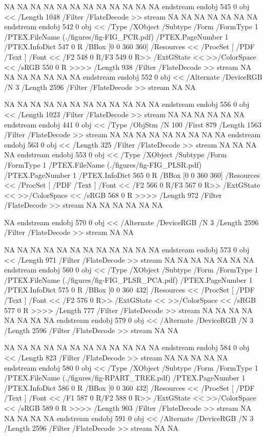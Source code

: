 {NA
NA
NA
NA
NA
NA
NA
NA
NA
NA
NA
NA
endstream
endobj
545 0 obj <<
/Length 1048      
/Filter /FlateDecode
>>
stream
NA
NA
NA
NA
NA
NA
NA
endstream
endobj
542 0 obj <<
/Type /XObject
/Subtype /Form
/FormType 1
/PTEX.FileName (./figures/fig-FIG_PCR.pdf)
/PTEX.PageNumber 1
/PTEX.InfoDict 547 0 R
/BBox [0 0 360 360]
/Resources <<
/ProcSet [ /PDF /Text ]
/Font << /F2 548 0 R/F3 549 0 R>>
/ExtGState <<
>>/ColorSpace <<
/sRGB 550 0 R
>>>>
/Length 938
/Filter /FlateDecode
>>
stream
NA
NA
NA
NA
NA
NA
NA
endstream
endobj
552 0 obj
<<
/Alternate /DeviceRGB
/N 3
/Length 2596
/Filter /FlateDecode
>>
stream
NA
NA

NA
NA
NA
NA
NA
NA
NA
NA
NA
NA
NA
NA
endstream
endobj
556 0 obj <<
/Length 1023      
/Filter /FlateDecode
>>
stream
NA
NA
NA
NA
NA
NA
endstream
endobj
441 0 obj <<
/Type /ObjStm
/N 100
/First 879
/Length 1563      
/Filter /FlateDecode
>>
stream
NA
NA
NA
NA
NA
NA
NA
NA
NA
endstream
endobj
563 0 obj <<
/Length 325       
/Filter /FlateDecode
>>
stream
NA
NA
NA
NA
endstream
endobj
553 0 obj <<
/Type /XObject
/Subtype /Form
/FormType 1
/PTEX.FileName (./figures/fig-FIG_PLSR.pdf)
/PTEX.PageNumber 1
/PTEX.InfoDict 565 0 R
/BBox [0 0 360 360]
/Resources <<
/ProcSet [ /PDF /Text ]
/Font << /F2 566 0 R/F3 567 0 R>>
/ExtGState <<
>>/ColorSpace <<
/sRGB 568 0 R
>>>>
/Length 972
/Filter /FlateDecode
>>
stream
NA
NA
NA
NA
NA
NA

NA
endstream
endobj
570 0 obj
<<
/Alternate /DeviceRGB
/N 3
/Length 2596
/Filter /FlateDecode
>>
stream
NA
NA

NA
NA
NA
NA
NA
NA
NA
NA
NA
NA
NA
NA
endstream
endobj
573 0 obj <<
/Length 971       
/Filter /FlateDecode
>>
stream
NA
NA
NA
NA
NA
NA
NA
endstream
endobj
560 0 obj <<
/Type /XObject
/Subtype /Form
/FormType 1
/PTEX.FileName (./figures/fig-FIG_PLSR_PCA.pdf)
/PTEX.PageNumber 1
/PTEX.InfoDict 575 0 R
/BBox [0 0 360 432]
/Resources <<
/ProcSet [ /PDF /Text ]
/Font << /F2 576 0 R>>
/ExtGState <<
>>/ColorSpace <<
/sRGB 577 0 R
>>>>
/Length 777
/Filter /FlateDecode
>>
stream
NA
NA
NA
NA
NA
NA
NA
NA
endstream
endobj
579 0 obj
<<
/Alternate /DeviceRGB
/N 3
/Length 2596
/Filter /FlateDecode
>>
stream
NA
NA

NA
NA
NA
NA
NA
NA
NA
NA
NA
NA
NA
NA
endstream
endobj
584 0 obj <<
/Length 823       
/Filter /FlateDecode
>>
stream
NA
NA
NA
NA
NA
endstream
endobj
580 0 obj <<
/Type /XObject
/Subtype /Form
/FormType 1
/PTEX.FileName (./figures/fig-RPART_TREE.pdf)
/PTEX.PageNumber 1
/PTEX.InfoDict 586 0 R
/BBox [0 0 360 432]
/Resources <<
/ProcSet [ /PDF /Text ]
/Font << /F1 587 0 R/F2 588 0 R>>
/ExtGState <<
>>/ColorSpace <<
/sRGB 589 0 R
>>>>
/Length 903
/Filter /FlateDecode
>>
stream
NA
NA
NA
NA
NA
endstream
endobj
591 0 obj
<<
/Alternate /DeviceRGB
/N 3
/Length 2596
/Filter /FlateDecode
>>
stream
NA
NA

}
